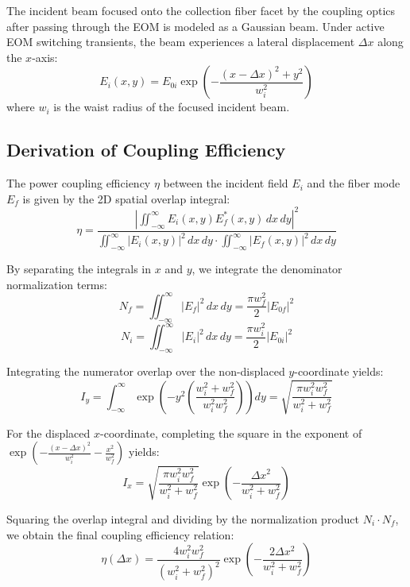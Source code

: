 \documentclass[11pt,twocolumn]{article}
\begin{document}
The incident beam focused onto the collection fiber facet by the coupling optics after passing through the EOM is modeled as a Gaussian beam. Under active EOM switching transients, the beam experiences a lateral displacement $\Delta x$ along the $x$-axis:
\begin{equation}
E_i(x, y) = E_{0i} \exp\left( -\frac{(x - \Delta x)^2 + y^2}{w_i^2} \right)
\end{equation}
where $w_i$ is the waist radius of the focused incident beam.

\subsection{Derivation of Coupling Efficiency}
The power coupling efficiency $\eta$ between the incident field $E_i$ and the fiber mode $E_f$ is given by the 2D spatial overlap integral:
\begin{equation}
\eta = \frac{\left| \iint_{-\infty}^{\infty} E_i(x, y) E_f^*(x, y) \, dx \, dy \right|^2}{\iint_{-\infty}^{\infty} |E_i(x, y)|^2 \, dx \, dy \cdot \iint_{-\infty}^{\infty} |E_f(x, y)|^2 \, dx \, dy}
\end{equation}

By separating the integrals in $x$ and $y$, we integrate the denominator normalization terms:
\begin{equation}
N_f = \iint_{-\infty}^{\infty} |E_f|^2 \, dx \, dy = \frac{\pi w_f^2}{2} |E_{0f}|^2
\end{equation}
\begin{equation}
N_i = \iint_{-\infty}^{\infty} |E_i|^2 \, dx \, dy = \frac{\pi w_i^2}{2} |E_{0i}|^2
\end{equation}

Integrating the numerator overlap over the non-displaced $y$-coordinate yields:
\begin{equation}
I_y = \int_{-\infty}^{\infty} \exp\left( -y^2 \left( \frac{w_i^2 + w_f^2}{w_i^2 w_f^2} \right) \right) dy = \sqrt{\frac{\pi w_i^2 w_f^2}{w_i^2 + w_f^2}}
\end{equation}

For the displaced $x$-coordinate, completing the square in the exponent of $\exp\left( -\frac{(x - \Delta x)^2}{w_i^2} - \frac{x^2}{w_f^2} \right)$ yields:
\begin{equation}
I_x = \sqrt{\frac{\pi w_i^2 w_f^2}{w_i^2 + w_f^2}} \exp\left( -\frac{\Delta x^2}{w_i^2 + w_f^2} \right)
\end{equation}

Squaring the overlap integral and dividing by the normalization product $N_i \cdot N_f$, we obtain the final coupling efficiency relation:
\begin{equation}
\eta(\Delta x) = \frac{4 w_i^2 w_f^2}{(w_i^2 + w_f^2)^2} \exp\left( -\frac{2\Delta x^2}{w_i^2 + w_f^2} \right)
\end{equation}
\end{document}
